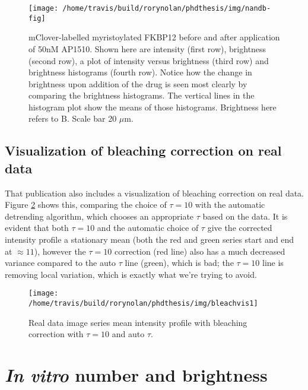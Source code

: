 \documentclass[12pt,]{book}
\theoremstyle{definition}
\theoremstyle{definition}
\theoremstyle{definition}
\theoremstyle{remark}
\begin{document}
\begin{figure}

\texttt{[image: /home/travis/build/rorynolan/phdthesis/img/nandb-fig]} \hfill{}

\caption{mClover-labelled myristoylated FKBP12 before and
after application of 50nM AP1510. Shown here are intensity (first row),
brightness (second row), a plot of intensity versus brightness (third
row) and brightness histograms (fourth row). Notice how the change in
brightness upon addition of the drug is seen most clearly by comparing
the brightness histograms. The vertical lines in the histogram plot show
the means of those histograms. Brightness here refers to B. Scale bar 20
\(\mu\)m. \citep{nandb}}\label{fig:nandb-fig}
\end{figure}

\subsection{Visualization of bleaching correction on real
data}\label{visualization-of-bleaching-correction-on-real-data}

That publication also includes a visualization of bleaching correction
on real data. Figure \ref{fig:bleachvis1} shows this, comparing the
choice of \(\tau=10\) with the automatic detrending algorithm, which
chooses an appropriate \(\tau\) based on the data. It is evident that
both \(\tau=10\) and the automatic choice of \(\tau\) give the corrected
intensity profile a stationary mean (both the red and green series start
and end at \(\approx 11\)), however the \(\tau = 10\) correction (red
line) also has a much decreased variance compared to the auto \(\tau\)
line (green), which is bad; the \(\tau = 10\) line is removing local
variation, which is exactly what we're trying to avoid.




\begin{figure}

\texttt{[image: /home/travis/build/rorynolan/phdthesis/img/bleachvis1]} \hfill{}

\caption{Real data image series mean intensity profile
with bleaching correction with \(\tau = 10\) and auto \(\tau\).}\label{fig:bleachvis1}
\end{figure}

\section{\texorpdfstring{\emph{In vitro} number and
brightness}{In vitro number and brightness}}\label{in-vitro-number-and-brightness}
\end{document}
